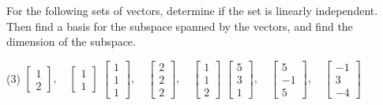\documentclass{ximera}
\begin{document}

\begin{exercise}%
    For the following sets of vectors, determine if the set is linearly independent. Then find a basis for the subspace spanned by the vectors, and find the dimension of the subspace.
    \begin{tasks}(3)
        \task
        $\begin{bmatrix}
        1 \\ 2
        \end{bmatrix}
        , \quad
        \begin{bmatrix}
        1 \\ 1
        \end{bmatrix}$
        \task
        $\begin{bmatrix}
        1 \\ 1 \\ 1
        \end{bmatrix}
        , \quad
        \begin{bmatrix}
        2 \\ 2 \\ 2
        \end{bmatrix}
        , \quad
        \begin{bmatrix}
        1 \\ 1 \\ 2
        \end{bmatrix}$
        \task
        $\begin{bmatrix}
        5 \\ 3 \\ 1
        \end{bmatrix}
        , \quad
        \begin{bmatrix}
        5 \\ -1 \\ 5
        \end{bmatrix}
        , \quad
        \begin{bmatrix}
        -1 \\ 3 \\ -4
        \end{bmatrix}$

\end{tasks}
\end{exercise}
\end{document}
